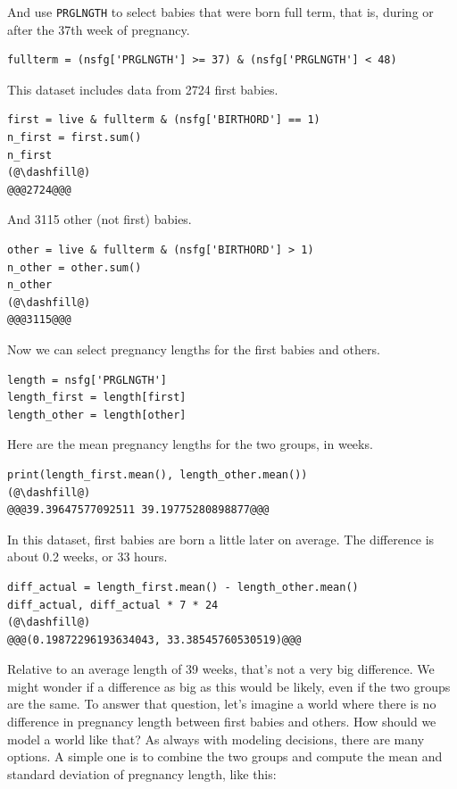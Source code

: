And use \passthrough{\lstinline!PRGLNGTH!} to select babies that were
born full term, that is, during or after the 37th week of pregnancy.

\begin{lstlisting}[]
fullterm = (nsfg['PRGLNGTH'] >= 37) & (nsfg['PRGLNGTH'] < 48)
\end{lstlisting}

This dataset includes data from 2724 first babies.

\begin{lstlisting}[]
first = live & fullterm & (nsfg['BIRTHORD'] == 1)
n_first = first.sum()
n_first
(@\dashfill@)
@@@2724@@@
\end{lstlisting}

And 3115 other (not first) babies.

\begin{lstlisting}[]
other = live & fullterm & (nsfg['BIRTHORD'] > 1)
n_other = other.sum()
n_other
(@\dashfill@)
@@@3115@@@
\end{lstlisting}

Now we can select pregnancy lengths for the first babies and others.

\begin{lstlisting}[]
length = nsfg['PRGLNGTH']
length_first = length[first]
length_other = length[other]
\end{lstlisting}

Here are the mean pregnancy lengths for the two groups, in weeks.

\begin{lstlisting}[]
print(length_first.mean(), length_other.mean())
(@\dashfill@)
@@@39.39647577092511 39.19775280898877@@@
\end{lstlisting}

In this dataset, first babies are born a little later on average. The
difference is about 0.2 weeks, or 33 hours.

\begin{lstlisting}[]
diff_actual = length_first.mean() - length_other.mean()
diff_actual, diff_actual * 7 * 24
(@\dashfill@)
@@@(0.19872296193634043, 33.38545760530519)@@@
\end{lstlisting}

Relative to an average length of 39 weeks, that's not a very big
difference. We might wonder if a difference as big as this would be
likely, even if the two groups are the same. To answer that question,
let's imagine a world where there is no difference in pregnancy length
between first babies and others. How should we model a world like that?
As always with modeling decisions, there are many options. A simple one
is to combine the two groups and compute the mean and standard deviation
of pregnancy length, like this:

